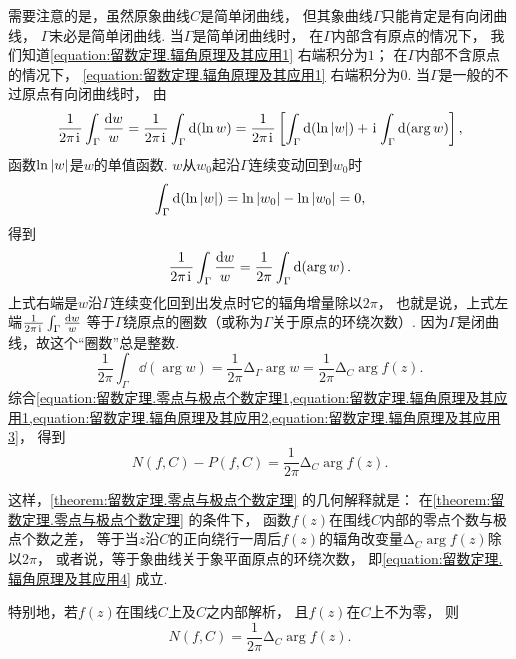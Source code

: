 需要注意的是，虽然原象曲线\(C\)是简单闭曲线，
但其象曲线\(\Gamma\)只能肯定是有向闭曲线，
\(\Gamma\)未必是简单闭曲线.
当\(\Gamma\)是简单闭曲线时，
在\(\Gamma\)内部含有原点的情况下，
我们知道\cref{equation:留数定理.辐角原理及其应用1} 右端积分为\(1\)；
在\(\Gamma\)内部不含原点的情况下，
\cref{equation:留数定理.辐角原理及其应用1} 右端积分为\(0\).
当\(\Gamma\)是一般的不过原点有向闭曲线时，
由\[
	\frac{1}{2\pi\kern1pt\mathrm{i}\kern1pt} \int_\Gamma \frac{\dd{w}}{w}
	= \frac{1}{2\pi\kern1pt\mathrm{i}\kern1pt} \int_\Gamma \dd(\ln w)
	= \frac{1}{2\pi\kern1pt\mathrm{i}\kern1pt} \left[ \int_\Gamma \dd(\ln\abs{w}) + \kern1pt\mathrm{i}\kern1pt \int_\Gamma \dd(\arg w) \right],
\]
函数\(\ln\abs{w}\)是\(w\)的单值函数.
\(w\)从\(w_0\)起沿\(\Gamma\)连续变动回到\(w_0\)时\[
	\int_\Gamma \dd(\ln\abs{w})
	= \ln\abs{w_0} - \ln\abs{w_0} = 0,
\]
得到\begin{equation}\label{equation:留数定理.辐角原理及其应用2}
	\frac{1}{2\pi\kern1pt\mathrm{i}\kern1pt} \int_\Gamma \frac{\dd{w}}{w}
	= \frac{1}{2\pi} \int_\Gamma \dd(\arg w).
\end{equation}
上式右端是\(w\)沿\(\Gamma\)连续变化回到出发点时它的辐角增量除以\(2\pi\)，
也就是说，上式左端\(\frac{1}{2\pi\kern1pt\mathrm{i}\kern1pt} \int_\Gamma \frac{\dd{w}}{w}\)
等于\(\Gamma\)绕原点的圈数（或称为\(\Gamma\)关于原点的环绕次数）.
因为\(\Gamma\)是闭曲线，故这个“圈数”总是整数.
\begin{equation}\label{equation:留数定理.辐角原理及其应用3}
	\frac{1}{2\pi} \int_\Gamma \dd(\arg w)
	= \frac{1}{2\pi} \increment_\Gamma \arg w
	= \frac{1}{2\pi} \increment_C \arg f(z).
\end{equation}
综合\cref{equation:留数定理.零点与极点个数定理1,equation:留数定理.辐角原理及其应用1,equation:留数定理.辐角原理及其应用2,equation:留数定理.辐角原理及其应用3}，
得到\begin{equation}\label{equation:留数定理.辐角原理及其应用4}
	N(f,C)-P(f,C) = \frac{1}{2\pi} \increment_C \arg f(z).
\end{equation}

这样，\cref{theorem:留数定理.零点与极点个数定理} 的几何解释就是：
在\cref{theorem:留数定理.零点与极点个数定理} 的条件下，
函数\(f(z)\)在围线\(C\)内部的零点个数与极点个数之差，
等于当\(z\)沿\(C\)的正向绕行一周后\(f(z)\)的辐角改变量\(\increment_C \arg f(z)\)除以\(2\pi\)，
或者说，等于象曲线关于象平面原点的环绕次数，
即\cref{equation:留数定理.辐角原理及其应用4} 成立.

特别地，若\(f(z)\)在围线\(C\)上及\(C\)之内部解析，
且\(f(z)\)在\(C\)上不为零，
则\begin{equation}\label{equation:留数定理.辐角原理及其应用5}
	N(f,C) = \frac{1}{2\pi} \increment_C \arg f(z).
\end{equation}


